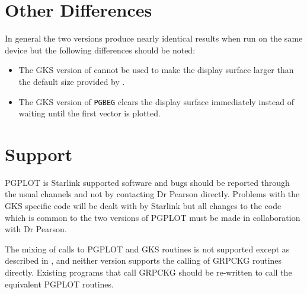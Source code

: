 \documentclass[twoside,11pt,nolof]{starlink}
\begin{document}
\section{Other Differences}
\label{other_differences}

In general the two versions produce nearly identical results when run on
the same device but the following differences should be noted:

\begin{itemize}
\item The GKS version of  cannot be
used to make the display surface larger than the default size provided by
.
\item The GKS version of \texttt{PGBEG} clears the display surface immediately
instead of waiting until the first vector is plotted.
\end{itemize}

\section{Support}
\label{support}

PGPLOT is Starlink supported software and bugs should be reported through the
usual channels and not by contacting Dr Pearson directly. Problems with the GKS
specific code will be dealt with by Starlink but all changes to the code which
is common to the two versions of PGPLOT must be made in collaboration with Dr
Pearson.

The mixing of calls to PGPLOT and GKS routines is not supported except as
described in , and neither
version supports the calling of GRPCKG routines directly. Existing programs
that call GRPCKG should be re-written to call the equivalent PGPLOT routines.




\end{document}
